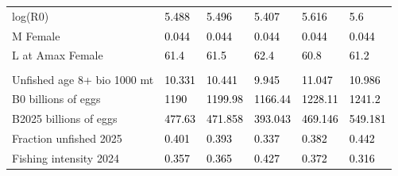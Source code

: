 \documentclass[
  english,
]{article}
\begin{document}
\begin{landscape}
\begin{longtable}[t]{ll>{\raggedright\arraybackslash}p{5em}>{\raggedright\arraybackslash}p{5em}>{\raggedright\arraybackslash}p{5em}>{\raggedright\arraybackslash}p{5em}}
\hspace{1em}log(R0) & \textcolor{black}{5.488} & \textcolor{black}{5.496} & \textcolor{black}{5.407} & \textcolor{black}{5.616} & \textcolor{black}{5.6}\\
\hspace{1em}M Female & \textcolor{black}{0.044} & \textcolor{black}{0.044} & \textcolor{black}{0.044} & \textcolor{black}{0.044} & \textcolor{black}{0.044}\\
\hspace{1em}L at Amax Female & \textcolor{black}{61.4} & \textcolor{black}{61.5} & \textcolor{black}{62.4} & \textcolor{black}{60.8} & \textcolor{black}{61.2}\\
\addlinespace[0.3em]
\multicolumn{6}{l}{\textbf{Estimates of derived quantities}}\\
\hspace{1em}Unfished age 8+ bio 1000 mt & \textcolor{black}{10.331} & \textcolor{black}{10.441} & \textcolor{black}{9.945} & \textcolor{black}{11.047} & \textcolor{black}{10.986}\\
\hspace{1em}B0 billions of eggs & \textcolor{black}{1190} & \textcolor{black}{1199.98} & \textcolor{black}{1166.44} & \textcolor{black}{1228.11} & \textcolor{black}{1241.2}\\
\hspace{1em}B2025 billions of eggs & \textcolor{black}{477.63} & \textcolor{black}{471.858} & \textcolor{black}{393.043} & \textcolor{black}{469.146} & \textcolor{black}{549.181}\\
\hspace{1em}Fraction unfished 2025 & \textcolor{black}{0.401} & \textcolor{black}{0.393} & \textcolor{black}{0.337} & \textcolor{black}{0.382} & \textcolor{black}{0.442}\\
\hspace{1em}Fishing intensity 2024 & \textcolor{black}{0.357} & \textcolor{black}{0.365} & \textcolor{black}{0.427} & \textcolor{black}{0.372} & \textcolor{black}{0.316}\\
\bottomrule

\end{longtable}

\endgroup{}


\end{landscape}

\newpage{}

\begingroup\fontsize{8}{10}\selectfont
\end{document}
